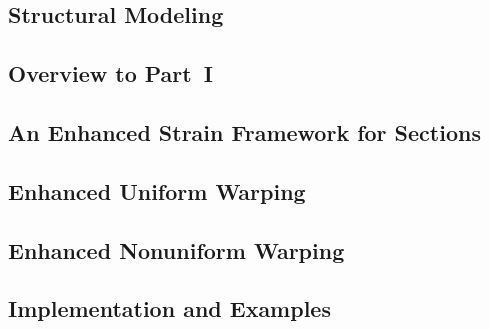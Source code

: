 \begin{Notation}[section]
% 


\part{Structural Modeling}\label{part:modeling}

\chapter{Overview to Part~I}\label{sec:Part-I}

\clearpage


\chapter{An Enhanced Strain Framework for Sections}\label{sec:gensec}

\clearpage

\chapter{Enhanced Uniform Warping}\label{sec:timo}

\clearpage

\chapter{Enhanced Nonuniform Warping}\label{sec:nonuniform}

\clearpage 

% 
% 

\chapter{Implementation and Examples}\label{sec:part-i-summary}

\clearpage



\end{Notation}
